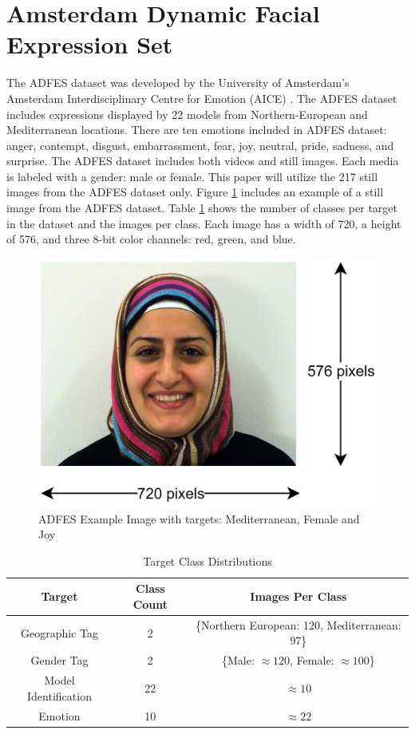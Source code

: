 \documentclass[journal]{new-aiaa}
\begin{document}
\section{Amsterdam Dynamic Facial Expression Set}\label{sec:Dataset}
The ADFES dataset was developed by the University of Amsterdam's Amsterdam Interdisciplinary Centre for Emotion (AICE) \cite{adfes}.
The ADFES dataset includes expressions displayed by 22 models from Northern-European and Mediterranean locations.
There are ten emotions included in ADFES dataset: anger, contempt, disgust, embarrassment, fear, joy, neutral, pride, sadness, and surprise.
The ADFES dataset includes both videos and still images.
Each media is labeled with a gender: male or female.
This paper will utilize the 217 still images from the ADFES dataset only.
Figure \ref{fig:ExampleImage} includes an example of a still image from the ADFES dataset.
Table \ref{table:Target Class Distributions} shows the number of classes per target in the dataset and the images per class.
Each image has a width of 720, a height of 576, and three 8-bit color channels: red, green, and blue.

\begin{figure}[H]
  \centering
  \includegraphics[width=.3\textwidth]{figures/Image Example.PNG}
  \caption{ADFES Example Image with targets: Mediterranean, Female and Joy}
  \label{fig:ExampleImage}
\end{figure}

\begin{table}[H]
  \centering
  \begin{tabular}{|| c | c | c ||} 
          \hline
          Target               & Class Count & Images Per Class \\ [0.5ex] 
          \hline\hline
          Geographic Tag       & 2 & \{Northern European: 120, Mediterranean: 97\} \\ [0.5ex] 
          \hline
          Gender Tag           & 2 & \{Male: $\approx120$, Female: $\approx100$\} \\ [0.5ex] 
          \hline
          Model Identification & 22 & $\approx 10$ \\ [0.5ex] 
          \hline
          Emotion              & 10 & $\approx 22$ \\ [0.5ex] 
          \hline
  \end{tabular}
  \caption{Target Class Distributions}
  \label{table:Target Class Distributions}
\end{table}
\end{document}
